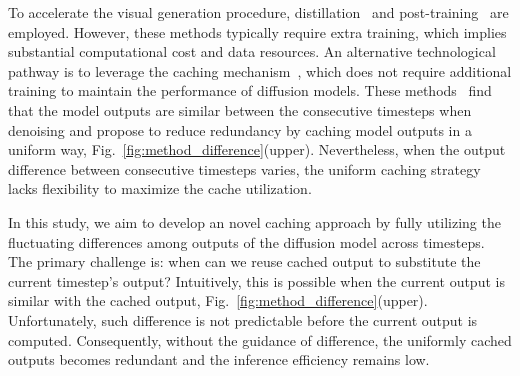 To accelerate the visual generation procedure,
distillation~\cite{sauer2023adversarial, wang2023videolcm, meng2023distillation} and post-training~\cite{chen2024q, ma2024learning} are employed. 
However, these methods typically require extra training, which implies substantial computational cost and data resources.
%
An alternative technological pathway is to leverage the caching mechanism~\cite{smith1982cache, goodman1983using, albonesi1999selective}, which does not require additional training to maintain the performance of diffusion models.
%
These methods~\cite{xu2018deepcache, selvaraju2024fora, zhao2024real, chen2024delta} find that the model outputs are similar between the consecutive timesteps when denoising and propose to reduce redundancy by caching model outputs in a uniform way, Fig.~\ref{fig:method_difference}(upper).
%
Nevertheless, when the output difference between consecutive timesteps varies, the uniform caching strategy lacks flexibility to maximize the cache utilization.

In this study, we aim to develop an novel caching approach by fully utilizing the fluctuating differences among outputs of the diffusion model across timesteps.
%
The primary challenge is: when can we reuse cached output to substitute the current timestep's output? Intuitively, this is possible when the current output is similar with the cached output, Fig.~\ref{fig:method_difference}(upper).
Unfortunately, such difference is not predictable before the current output is computed. Consequently, without the guidance of difference, the uniformly cached outputs becomes redundant and the inference efficiency remains low.

